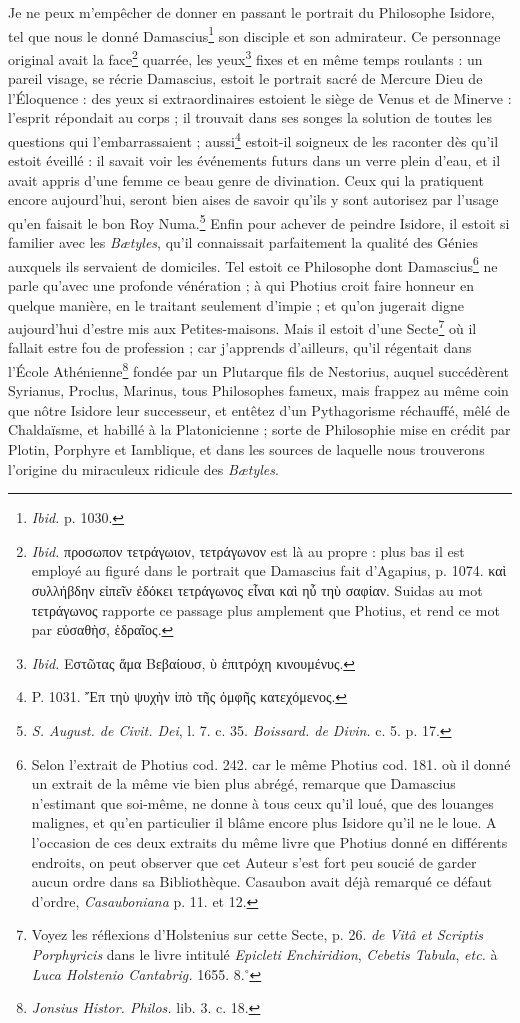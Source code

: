 \documentclass[a4paper, 11pt, oneside, polutonikogreek, french]{article}
\begin{document}
Je ne peux m'empêcher de donner en passant le portrait du Philosophe Isidore, tel que nous le donné Damascius\footnote{\emph{Ibid.} p. 1030.} son disciple et son admirateur. Ce personnage original avait la face\footnote{\emph{Ibid.} προσωπον τετράγωιον, τετράγωνον est là au propre : plus bas il est employé au figuré dans le portrait que Damascius fait d'Agapius, p. 1074. καὶ συλλήβδην εἰπεῖν ἐδόκει τετράγωνος εἶναι καὶ ηὖ τηὺ σαφἱαν. Suidas au mot τετράγωνος rapporte ce passage plus amplement que Photius, et rend ce mot par εὐσαθὴσ, ἑδραῖος.} quarrée, les yeux\footnote{\emph{Ibid.} Εστῶτας ἅμα Βεβαίουσ, ὺ ἐπιτρόχη κινουμένυς.} fixes et en même temps roulants : un pareil visage, se récrie Damascius, estoit le portrait sacré de Mercure Dieu de l'Éloquence : des yeux si extraordinaires estoient le siège de Venus et de Minerve : l'esprit répondait au corps ; il trouvait dans ses songes la solution de toutes les questions qui l'embarrassaient ; aussi\footnote{P. 1031. Ἔπ τηὺ ψυχὴν ἱπὸ τῆς ὀμφῆς κατεχόμενος.} estoit-il soigneux de les raconter dès qu'il estoit éveillé : il savait voir les événements futurs dans un verre plein d'eau, et il avait appris d'une femme ce beau genre de divination. Ceux qui la pratiquent encore aujourd’hui, seront bien aises de savoir qu'ils y sont autorisez par l'usage qu'en faisait le bon Roy Numa.\footnote{\emph{S. August. de Civit. Dei}, l. 7. c. 35. \emph{Boissard. de Divin.} c. 5. p. 17.} Enfin pour achever de peindre Isidore, il estoit si familier avec les \emph{Bætyles}, qu'il connaissait parfaitement la qualité des Génies auxquels ils servaient de domiciles. Tel estoit ce Philosophe dont Damascius\footnote{Selon l'extrait de Photius cod. 242. car le même Photius cod. 181. où il donné un extrait de la même vie bien plus abrégé, remarque que Damascius n'estimant que soi-même, ne donne à tous ceux qu'il loué, que des louanges malignes, et qu'en particulier il blâme encore plus Isidore qu'il ne le loue. A l'occasion de ces deux extraits du même livre que Photius donné en différents endroits, on peut observer que cet Auteur s'est fort peu soucié de garder aucun ordre dans sa Bibliothèque. Casaubon avait déjà remarqué ce défaut d'ordre, \emph{Casauboniana} p. 11. et 12.} ne parle qu'avec une profonde vénération ; à qui Photius croit faire honneur en quelque manière, en le traitant seulement d'impie ; et qu'on jugerait digne aujourd’hui d'estre mis aux Petites-maisons. Mais il estoit d'une Secte\footnote{Voyez les réflexions d'Holstenius sur cette Secte, p. 26. \emph{de Vitâ et Scriptis Porphyricis} dans le livre intitulé \emph{Epicleti Enchiridion}, \emph{Cebetis Tabula}, \emph{etc.} à \emph{Luca Holstenio Cantabrig.} 1655. 8.$^\circ$} où il fallait estre fou de profession ; car j'apprends d'ailleurs, qu'il régentait dans l'École Athénienne\footnote{\emph{Jonsius Histor. Philos.} lib. 3. c. 18.} fondée par un Plutarque fils de Nestorius, auquel succédèrent Syrianus, Proclus, Marinus, tous Philosophes fameux, mais frappez au même coin que nôtre Isidore leur successeur, et entêtez d'un Pythagorisme réchauffé, mêlé de Chaldaïsme, et habillé à la Platonicienne ; sorte de Philosophie mise en crédit par Plotin, Porphyre et Iamblique, et dans les sources de laquelle nous trouverons l'origine du miraculeux ridicule des \emph{Bætyles}.
\end{document}
